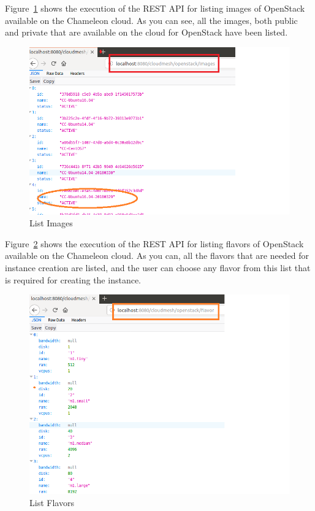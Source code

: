 Figure~\ref{fig:list-images} shows the execution of the REST API for listing
images of OpenStack available on the Chameleon cloud. As you can see, all the
images, both public and private that are available on the cloud for OpenStack
have been listed.

\begin{figure}[!ht]
        \centering\includegraphics[width=\columnwidth]{images/images.png}
        \caption{List Images}\label{fig:list-images}
\end{figure}

Figure~\ref{fig:list-flavors} shows the execution of the REST API for listing
flavors of OpenStack available on the Chameleon cloud. As you can, all the 
flavors that are needed for instance creation are listed, and the user can 
choose any flavor from this list that is required for creating the instance.  

\begin{figure}[!ht]
        \centering\includegraphics[width=\columnwidth]{images/flavors.png}
        \caption{List Flavors}\label{fig:list-flavors}
\end{figure}

